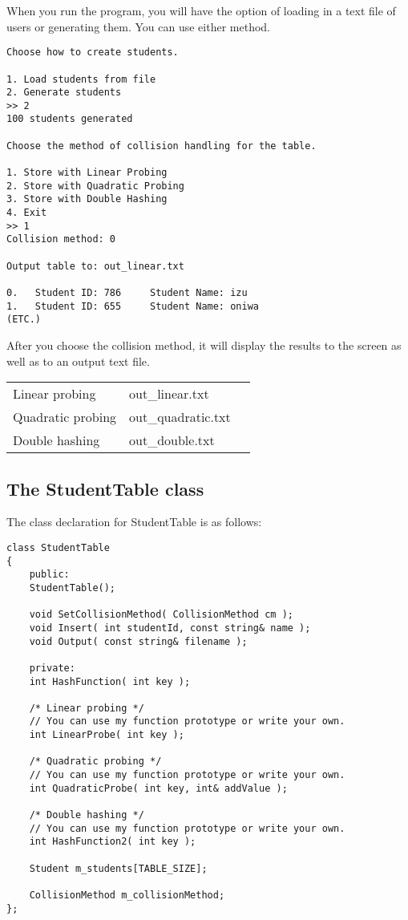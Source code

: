 \documentclass[a4paper,12pt,oneside]{book}
\begin{document}
When you run the program, you will have the option of loading in
a text file of users or generating them. You can use either method.

\begin{lstlisting}[style=output]
Choose how to create students.

1. Load students from file
2. Generate students
>> 2
100 students generated

Choose the method of collision handling for the table.

1. Store with Linear Probing
2. Store with Quadratic Probing
3. Store with Double Hashing
4. Exit
>> 1
Collision method: 0

Output table to: out_linear.txt

0.   Student ID: 786 	 Student Name: izu
1.   Student ID: 655 	 Student Name: oniwa
(ETC.)
\end{lstlisting}

After you choose the collision method, it will display the results
to the screen as well as to an output text file.

\begin{center}
    \begin{tabular}{l l l}
        Linear probing & out\_linear.txt \\
        Quadratic probing & out\_quadratic.txt \\
        Double hashing & out\_double.txt    
    \end{tabular}
\end{center}


\subsection{The StudentTable class}

The class declaration for StudentTable is as follows:

\begin{lstlisting}[style=code]
class StudentTable
{
    public:
    StudentTable();

    void SetCollisionMethod( CollisionMethod cm );
    void Insert( int studentId, const string& name );
    void Output( const string& filename );

    private:
    int HashFunction( int key );

    /* Linear probing */
    // You can use my function prototype or write your own.
    int LinearProbe( int key );

    /* Quadratic probing */
    // You can use my function prototype or write your own.
    int QuadraticProbe( int key, int& addValue );

    /* Double hashing */
    // You can use my function prototype or write your own.
    int HashFunction2( int key );

    Student m_students[TABLE_SIZE];

    CollisionMethod m_collisionMethod;
};
\end{lstlisting}
\end{document}
